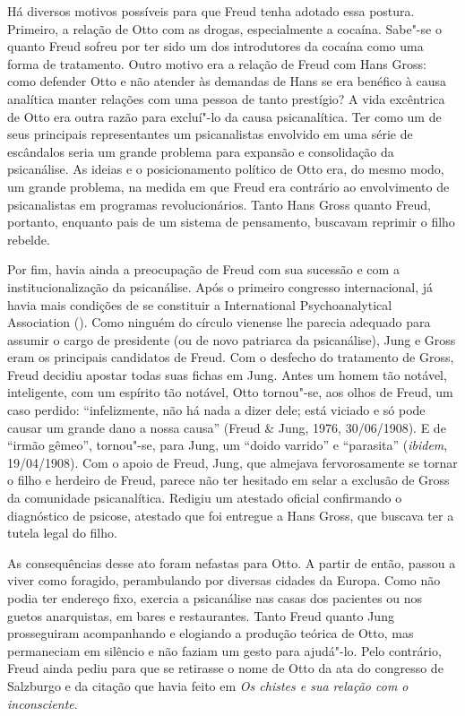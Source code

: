Há diversos motivos possíveis para que Freud tenha adotado essa postura.
Primeiro, a relação de Otto com as drogas, especialmente a cocaína.
Sabe"-se o quanto Freud sofreu por ter sido um dos introdutores da
cocaína como uma forma de tratamento. Outro motivo era a relação de
Freud com Hans Gross: como defender Otto e não atender às demandas de
Hans se era benéfico à causa analítica manter relações com uma pessoa de
tanto prestígio? A vida excêntrica de Otto era outra razão para
excluí"-lo da causa psicanalítica. Ter como um de seus principais
representantes um psicanalistas envolvido em uma série de escândalos
seria um grande problema para expansão e consolidação da psicanálise. As
ideias e o posicionamento político de Otto era, do mesmo modo, um grande
problema, na medida em que Freud era contrário ao envolvimento de
psicanalistas em programas revolucionários. Tanto Hans Gross quanto
Freud, portanto, enquanto pais de um sistema de pensamento, buscavam
reprimir o filho rebelde.

Por fim, havia ainda a preocupação de Freud com sua sucessão e com a
institucionalização da psicanálise. Após o primeiro congresso
internacional, já havia mais condições de se constituir a International
Psychoanalytical Association (). Como ninguém do círculo vienense lhe
parecia adequado para assumir o cargo de presidente (ou de novo
patriarca da psicanálise), Jung e Gross eram os principais candidatos de
Freud. Com o desfecho do tratamento de Gross, Freud decidiu apostar
todas suas fichas em Jung. Antes um homem tão notável, inteligente, com
um espírito tão notável, Otto tornou"-se, aos olhos de Freud, um caso
perdido: ``infelizmente, não há nada a dizer dele; está viciado e só
pode causar um grande dano a nossa causa'' (Freud \& Jung, 1976,
30/06/1908). E de ``irmão gêmeo'', tornou"-se, para Jung, um ``doido
varrido'' e ``parasita'' (\emph{ibidem}, 19/04/1908). Com o apoio de
Freud, Jung, que almejava fervorosamente se tornar o filho e herdeiro de
Freud, parece não ter hesitado em selar a exclusão de Gross da
comunidade psicanalítica. Redigiu um atestado oficial confirmando o
diagnóstico de psicose, atestado que foi entregue a Hans Gross, que
buscava ter a tutela legal do filho.

As consequências desse ato foram nefastas para Otto. A partir de então,
passou a viver como foragido, perambulando por diversas cidades da
Europa. Como não podia ter endereço fixo, exercia a psicanálise nas
casas dos pacientes ou nos guetos anarquistas, em bares e restaurantes.
Tanto Freud quanto Jung prosseguiram acompanhando e elogiando a produção
teórica de Otto, mas permaneciam em silêncio e não faziam um gesto para
ajudá"-lo. Pelo contrário, Freud ainda pediu para que se retirasse o nome
de Otto da ata do congresso de Salzburgo e da citação que havia feito em
\emph{Os chistes e sua relação com o inconsciente}.

